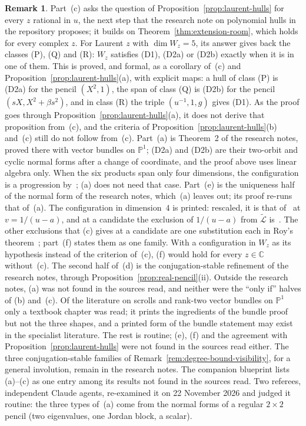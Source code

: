 \documentclass[11pt,a4paper]{article}
\theoremstyle{plain}
\theoremstyle{definition}
\newtheorem{remark}[theorem]{Remark}
\newcommand{\C}{\mathbb{C}}
\newcommand{\aLogs}{\widetilde{\mathcal{L}}}
\begin{document}
\begin{remark}\label{rem:rational-hulls-credit}
Part~(c) asks the question of Proposition~\ref{prop:laurent-hulls} for every $z$ rational in $u$, the next step that
the research note on polynomial hulls in the repository proposes; it builds on Theorem~\ref{thm:extension-room}, which
holds for every complex $z$. For Laurent $z$ with $\dim W_{z}=5$, its answer gives back the classes (P), (Q)
and (R): $W_{z}$ satisfies (D1), (D2a) or (D2b) exactly when it is in one of them. This is proved, and formal, as a
corollary of~(c) and Proposition~\ref{prop:laurent-hulls}(a), with explicit maps: a hull of class (P) is (D2a) for the
pencil $(X^{2},1)$, the span of class (Q) is (D2b) for the pencil $(sX,X^{2}+\beta s^{2})$, and in class (R) the triple
$(u^{-1},1,g)$ gives (D1). As the proof goes through Proposition~\ref{prop:laurent-hulls}(a), it does not derive that
proposition from~(c), and the criteria of Proposition~\ref{prop:laurent-hulls}(b) and~(c) still do not follow
from~(c). Part~(a) is Theorem~2 of the research notes, proved there with vector bundles on
$\mathbb{P}^{1}$; (D2a) and (D2b) are their two-orbit and cyclic normal forms after a change of coordinate, and the
proof above uses linear algebra only. When the six products span only four dimensions, the configuration is a
progression by~\cite[Lemma~4]{bachoc-serra-zemor}; (a) does not need that case. Part~(e) is the uniqueness half of the
normal form of the research notes, which~(a) leaves out; its proof re-runs that of~(a). The configuration in dimension~$4$ is
printed: rescaled, it is that of~\cite[Th\'eor\`eme~7(1)]{diaz-2007} at $v=1/(u-a)$, and at a candidate the
exclusion of $1/(u-a)$ from $\aLogs$ is~\cite[Corollaire~5(4)]{diaz-2007}. The other exclusions that (c) gives at a
candidate are one substitution each in Roy's theorem~\cite{roy-1992}; part~(f) states them as one family. With a
configuration in $W_{z}$ as its hypothesis instead of the criterion of~(c), (f) would hold for every $z\in\C$
without~(c). The second half
of~(d) is the conjugation-stable refinement of the research notes, through Proposition~\ref{prop:real-pencil}(ii).
Outside the research notes, (a) was not found in the sources read, and neither were the ``only if'' halves of (b)
and~(c). Of the literature on scrolls and rank-two vector bundles on $\mathbb{P}^{1}$ only a textbook chapter was
read; it prints the ingredients of the bundle proof but not the three shapes, and a printed form of the bundle
statement may exist in the specialist literature. The rest is routine; (e), (f) and the agreement with
Proposition~\ref{prop:laurent-hulls} were not found in the sources read either. The three conjugation-stable families of
Remark~\ref{rem:degree-bound-visibility}, for a general involution, remain in the research notes. The companion
blueprint lists (a)--(c) as one entry among its results not found in the sources read. Two referees, independent Claude agents, re-examined it
on 22 November 2026 and judged it routine: the three types of~(a) come from the normal forms of a regular $2\times2$
pencil (two eigenvalues, one Jordan block, a scalar).
\end{remark}
\end{document}
